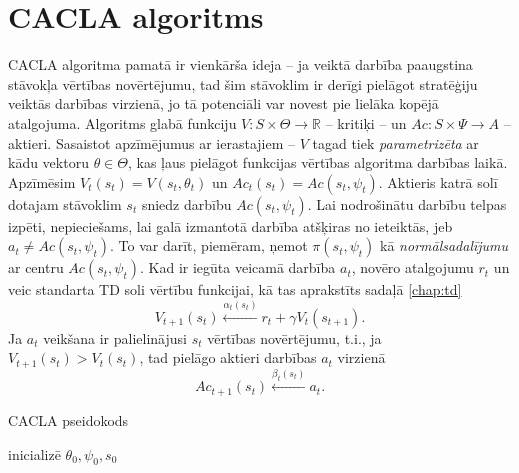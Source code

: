 \documentclass{ludis} %
\begin{document}
\chapter{CACLA algoritms}
CACLA algoritma pamatā ir vienkārša ideja -- ja veiktā darbība paaugstina
stāvokļa vērtības novērtējumu, tad šim stāvoklim ir derīgi pielāgot stratēģiju
veiktās darbības virzienā, jo tā potenciāli var novest pie lielāka kopējā
atalgojuma.
Algoritms glabā funkciju $V:S \times \Theta \rightarrow \mathbb{R}$ -- kritiķi
-- un $Ac : S \times \Psi \rightarrow A$ -- aktieri. Sasaistot apzīmējumus ar
ierastajiem -- $V$ tagad tiek \textit{parametrizēta} ar kādu vektoru $\theta \in
\Theta$, kas ļaus pielāgot funkcijas vērtības algoritma darbības laikā.
Apzīmēsim $V_t(s_t) = V(s_t, \theta_t)$ un $Ac_t(s_t) = Ac(s_t, \psi_t)$.
Aktieris katrā solī dotajam stāvoklim $s_t$ sniedz darbību $Ac(s_t, \psi_t)$.
Lai nodrošinātu darbību telpas izpēti, nepieciešams, lai galā izmantotā darbība
atšķiras no ieteiktās, jeb $a_t \neq Ac(s_t, \psi_t)$. To var darīt, piemēram,
ņemot $\pi(s_t, \psi_t)$ kā \textit{normālsadalījumu} ar centru $Ac(s_t,
\psi_t)$. Kad ir iegūta veicamā darbība $a_t$, novēro atalgojumu $r_t$ un veic
standarta TD soli vērtību funkcijai, kā tas aprakstīts sadaļā \ref{chap:td}
\[
	V_{t+1}(s_t) \xleftarrow{\alpha_t(s_t)} r_t + \gamma V_t(s_{t + 1}).
\]
Ja $a_t$ veikšana ir palielinājusi $s_t$ vērtības novērtējumu, t.i., ja
$V_{t+1}(s_t) > V_t(s_t)$, tad pielāgo aktieri darbības $a_t$ virzienā
\[
	Ac_{t+1}(s_t) \xleftarrow{\beta_t(s_t)} a_t.
\]


\begin{spacing}{1}
\begin{algorithm}
\caption{CACLA pseidokods}\label{alg:cacla}
inicializē $\theta_0, \psi_0, s_0$ \\
\end{algorithm}
\end{spacing}
\end{document}
